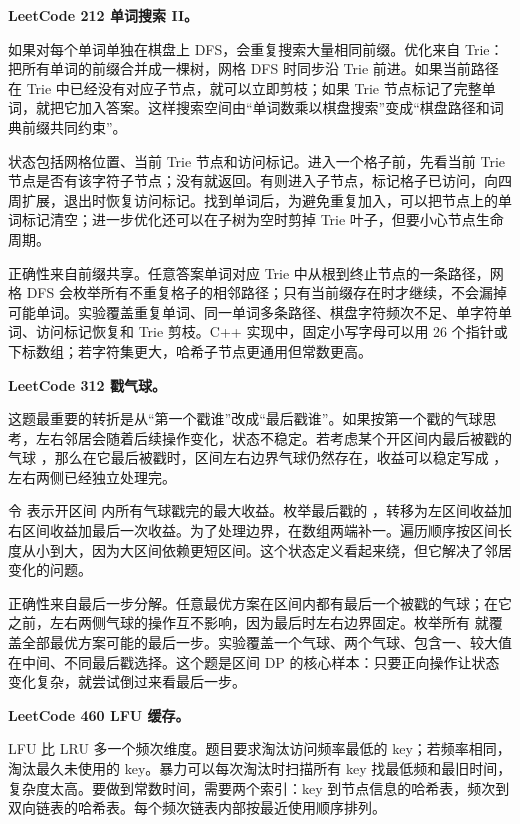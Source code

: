 \noindent\textbf{LeetCode 212 单词搜索 II。}

如果对每个单词单独在棋盘上 DFS，会重复搜索大量相同前缀。优化来自 Trie：把所有单词的前缀合并成一棵树，网格 DFS 时同步沿 Trie 前进。如果当前路径在 Trie 中已经没有对应子节点，就可以立即剪枝；如果 Trie 节点标记了完整单词，就把它加入答案。这样搜索空间由“单词数乘以棋盘搜索”变成“棋盘路径和词典前缀共同约束”。

状态包括网格位置、当前 Trie 节点和访问标记。进入一个格子前，先看当前 Trie 节点是否有该字符子节点；没有就返回。有则进入子节点，标记格子已访问，向四周扩展，退出时恢复访问标记。找到单词后，为避免重复加入，可以把节点上的单词标记清空；进一步优化还可以在子树为空时剪掉 Trie 叶子，但要小心节点生命周期。

正确性来自前缀共享。任意答案单词对应 Trie 中从根到终止节点的一条路径，网格 DFS 会枚举所有不重复格子的相邻路径；只有当前缀存在时才继续，不会漏掉可能单词。实验覆盖重复单词、同一单词多条路径、棋盘字符频次不足、单字符单词、访问标记恢复和 Trie 剪枝。C++ 实现中，固定小写字母可以用 26 个指针或下标数组；若字符集更大，哈希子节点更通用但常数更高。

\noindent\textbf{LeetCode 312 戳气球。}

这题最重要的转折是从“第一个戳谁”改成“最后戳谁”。如果按第一个戳的气球思考，左右邻居会随着后续操作变化，状态不稳定。若考虑某个开区间内最后被戳的气球 ，那么在它最后被戳时，区间左右边界气球仍然存在，收益可以稳定写成 ，左右两侧已经独立处理完。

令  表示开区间  内所有气球戳完的最大收益。枚举最后戳的 ，转移为左区间收益加右区间收益加最后一次收益。为了处理边界，在数组两端补一。遍历顺序按区间长度从小到大，因为大区间依赖更短区间。这个状态定义看起来绕，但它解决了邻居变化的问题。

正确性来自最后一步分解。任意最优方案在区间内都有最后一个被戳的气球；在它之前，左右两侧气球的操作互不影响，因为最后时左右边界固定。枚举所有  就覆盖全部最优方案可能的最后一步。实验覆盖一个气球、两个气球、包含一、较大值在中间、不同最后戳选择。这个题是区间 DP 的核心样本：只要正向操作让状态变化复杂，就尝试倒过来看最后一步。

\noindent\textbf{LeetCode 460 LFU 缓存。}

LFU 比 LRU 多一个频次维度。题目要求淘汰访问频率最低的 key；若频率相同，淘汰最久未使用的 key。暴力可以每次淘汰时扫描所有 key 找最低频和最旧时间，复杂度太高。要做到常数时间，需要两个索引：key 到节点信息的哈希表，频次到双向链表的哈希表。每个频次链表内部按最近使用顺序排列。

